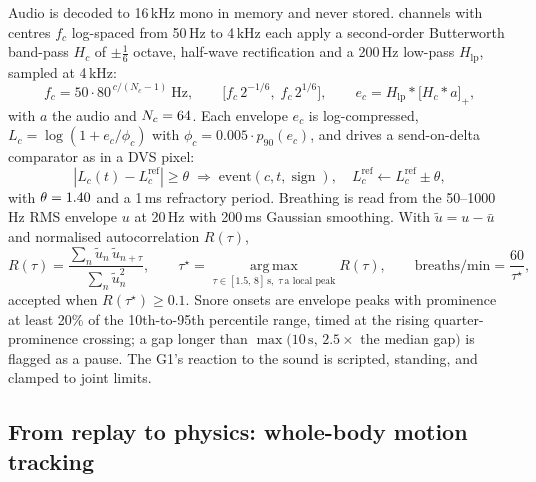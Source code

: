 \documentclass[10pt]{article}
\begin{document}
Audio is decoded to 16\,kHz mono in memory and never stored. \SnoreChannels{} channels with centres $f_c$ log-spaced from 50\,Hz to 4\,kHz each apply a second-order Butterworth band-pass $H_c$ of $\pm\frac16$ octave, half-wave rectification and a 200\,Hz low-pass $H_{\mathrm{lp}}$, sampled at 4\,kHz:
\begin{equation}
  f_c = 50\cdot 80^{\,c/(N_c-1)}\ \mathrm{Hz},\qquad \big[f_c\,2^{-1/6},\; f_c\,2^{1/6}\big], \qquad
  e_c = H_{\mathrm{lp}} * \big[H_c * a\big]_+ ,
  \label{eq:filterbank}
\end{equation}
with $a$ the audio and $N_c=64$. Each envelope $e_c$ is log-compressed, $L_c=\log(1+e_c/\phi_c)$ with $\phi_c = 0.005\cdot p_{90}(e_c)$, and drives a send-on-delta comparator as in a DVS pixel:
\begin{equation}
  |L_c(t) - L^{\mathrm{ref}}_c| \ge \theta \;\Rightarrow\; \text{event}(c,t,\operatorname{sign}),\quad L^{\mathrm{ref}}_c \leftarrow L^{\mathrm{ref}}_c \pm \theta,
  \label{eq:cochlea}
\end{equation}
with $\theta=1.40$ and a 1\,ms refractory period. Breathing is read from the 50--1000\,Hz RMS envelope $u$ at 20\,Hz with 200\,ms Gaussian smoothing. With $\tilde u = u-\bar u$ and normalised autocorrelation $R(\tau)$,
\begin{equation}
  R(\tau) = \frac{\sum_n \tilde u_n\,\tilde u_{n+\tau}}{\sum_n \tilde u_n^2}, \qquad
  \tau^\star = \operatorname*{arg\,max}_{\tau\in[1.5,\,8]\,\mathrm{s},\;\tau\ \text{a local peak}} R(\tau), \qquad
  \text{breaths/min} = \frac{60}{\tau^\star},
  \label{eq:cadence}
\end{equation}
accepted when $R(\tau^\star)\ge0.1$. Snore onsets are envelope peaks with prominence at least 20\% of the 10th-to-95th percentile range, timed at the rising quarter-prominence crossing; a gap longer than $\max(10\,\mathrm{s},\,2.5\times$ the median gap$)$ is flagged as a pause. The G1's reaction to the sound is scripted, standing, and clamped to joint limits.

\subsection{From replay to physics: whole-body motion tracking}
\label{sec:physics}
\end{document}
